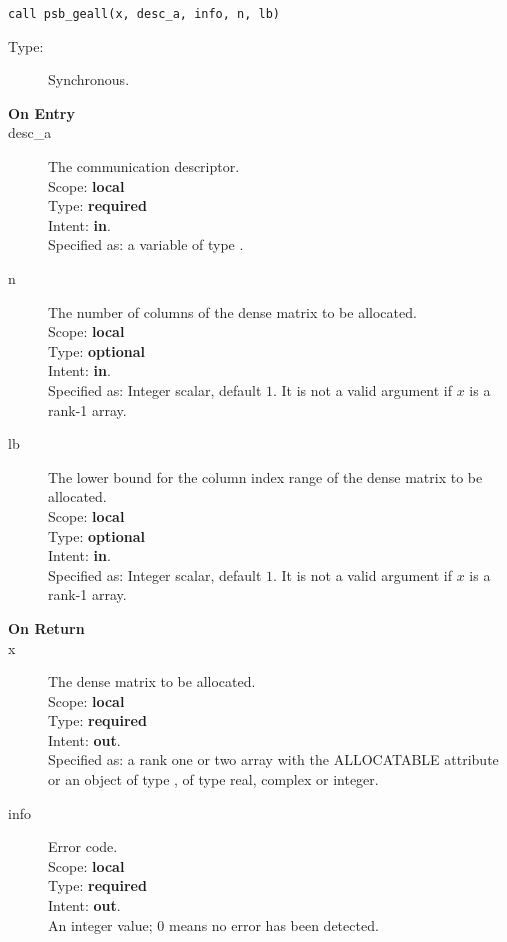 \begin{verbatim}
call psb_geall(x, desc_a, info, n, lb)
\end{verbatim}

\begin{description}
\item[Type:] Synchronous.
\item[\bf On Entry]
\item[desc\_a] The communication descriptor.\\
Scope: {\bf local} \\
Type: {\bf required}\\
Intent: {\bf in}.\\
Specified as: a variable of type \descdata.\\
\item[n] The number of columns of the dense matrix to be allocated.\\
Scope: {\bf local} \\
Type: {\bf optional}\\
Intent: {\bf in}.\\
Specified as: Integer scalar, default $1$. It is not a valid argument  if $x$ is a
rank-1 array. 
\item[lb] The lower bound for the column index range of the dense matrix to be allocated.\\
Scope: {\bf local} \\
Type: {\bf optional}\\
Intent: {\bf in}.\\
Specified as: Integer scalar, default $1$. It is not a valid argument if $x$ is a
rank-1 array. 
\end{description}

\begin{description}
\item[\bf On Return]
\item[x] The dense matrix to be allocated.\\
Scope: {\bf local} \\
Type: {\bf required}\\
Intent: {\bf out}.\\
Specified as: a rank one or two array with the ALLOCATABLE  attribute
or an object of type \vdata, of type real, complex or integer.\\ 
\item[info] Error code.\\
Scope: {\bf local} \\
Type: {\bf required} \\
Intent: {\bf out}.\\
An integer value; 0 means no error has been detected. 
\end{description}


